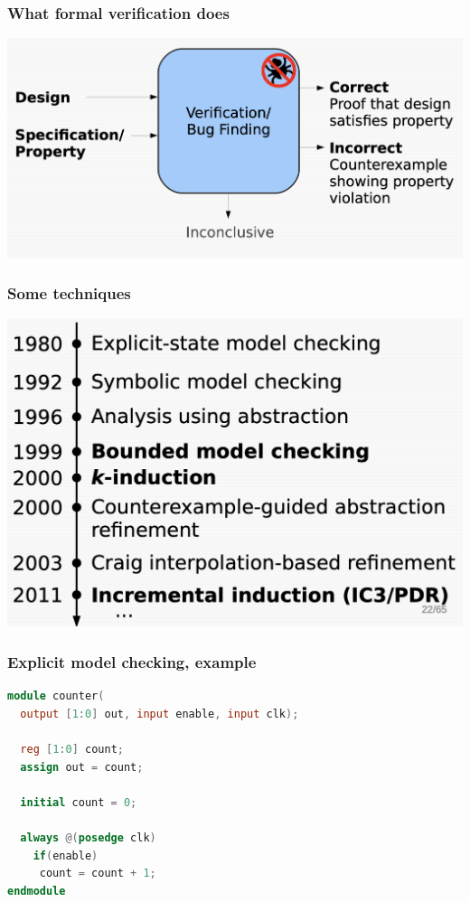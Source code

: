\documentclass[usenames,dvipsnames]{beamer}
\begin{document}
\begin{frame}
  \frametitle{What formal verification does}
  
  \centering
  \includegraphics[scale=.3]{formal-verification}
  
  
\end{frame}

\begin{frame}
  \frametitle{Some techniques}
  
  \centering
  \includegraphics[scale=.35]{timeline}
  
\end{frame}


\begin{frame}[fragile]
  \frametitle{Explicit model checking, example}
  
\begin{lstlisting}[language=Verilog]
module counter(
  output [1:0] out, input enable, input clk);

  reg [1:0] count;
  assign out = count;

  initial count = 0;

  always @(posedge clk)
    if(enable)
     count = count + 1;
endmodule
 
 \end{lstlisting}

\end{frame}
\end{document}
